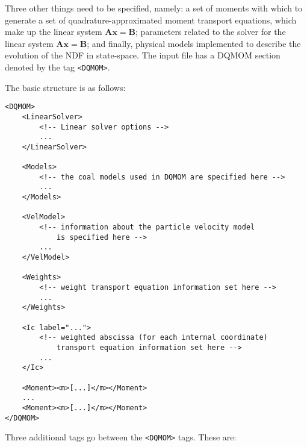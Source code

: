 Three other things need to be specified, namely: a set of moments with which to generate a set of quadrature-approximated moment transport equations, which make up the linear system $\mathbf{Ax}=\mathbf{B}$; parameters related to the solver for the linear system $\mathbf{Ax} = \mathbf{B}$; and finally, physical models implemented to describe the evolution of the NDF in state-space. The input file has a DQMOM section denoted by the tag \verb=<DQMOM>=.

The basic structure is as follows:

\begin{Verbatim}[fontsize=\footnotesize]
<DQMOM>
	<LinearSolver>
		<!-- Linear solver options -->
		...
	</LinearSolver>
	
	<Models>
		<!-- the coal models used in DQMOM are specified here -->
		...
	</Models>
	
	<VelModel>
		<!-- information about the particle velocity model 
			is specified here -->
		...
	</VelModel>
	
	<Weights>
		<!-- weight transport equation information set here -->
		...
	</Weights>
	
	<Ic label="...">
		<!-- weighted abscissa (for each internal coordinate)
			transport equation information set here -->
		...
	</Ic>
	
	<Moment><m>[...]</m></Moment>
	...
	<Moment><m>[...]</m></Moment>
</DQMOM>
\end{Verbatim}

Three additional tags go between the \verb=<DQMOM>= tags.  These are:

